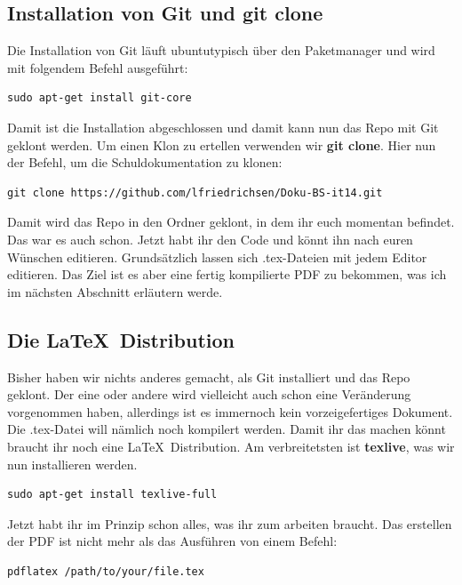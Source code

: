 \documentclass[a4paper,11pt]{scrartcl}	%
\begin{document}
	\subsection{Installation von Git und git clone}
	Die Installation von Git läuft ubuntutypisch über den Paketmanager und wird mit folgendem Befehl ausgeführt:

		\begin{lstlisting}[frame=single]
sudo apt-get install git-core
		\end{lstlisting}

	Damit ist die Installation abgeschlossen und damit kann nun das Repo mit Git geklont werden.
	Um einen Klon zu ertellen verwenden wir  \textbf{git clone}. Hier nun der Befehl, um die Schuldokumentation zu klonen:

		\begin{lstlisting}[frame=single]
git clone https://github.com/lfriedrichsen/Doku-BS-it14.git
		\end{lstlisting}

	Damit wird das Repo in den Ordner geklont, in dem ihr euch momentan befindet. Das war es auch schon. Jetzt habt ihr
	den Code und könnt ihn nach euren Wünschen editieren. Grundsätzlich lassen sich .tex-Dateien mit jedem Editor
	editieren. Das Ziel ist es aber eine fertig kompilierte PDF zu bekommen, was ich im nächsten Abschnitt erläutern 
	werde.

	\subsection{Die \LaTeX\ Distribution}
	Bisher haben wir nichts anderes gemacht, als Git installiert und das Repo geklont. Der eine oder andere wird vielleicht
	auch schon eine Veränderung vorgenommen haben, allerdings ist es immernoch kein vorzeigefertiges Dokument.
	Die .tex-Datei will nämlich noch kompilert werden. Damit ihr das machen könnt braucht ihr noch eine \LaTeX\  
	Distribution. Am verbreitetsten ist \textbf{texlive}, was wir nun installieren werden.

		\begin{lstlisting}[frame=single]
sudo apt-get install texlive-full
		\end{lstlisting}

	Jetzt habt ihr im Prinzip schon alles, was ihr zum arbeiten braucht. Das erstellen der PDF ist nicht mehr als das
	Ausführen von einem Befehl:

		\begin{lstlisting}[frame=single]
pdflatex /path/to/your/file.tex
		\end{lstlisting}
\end{document}
